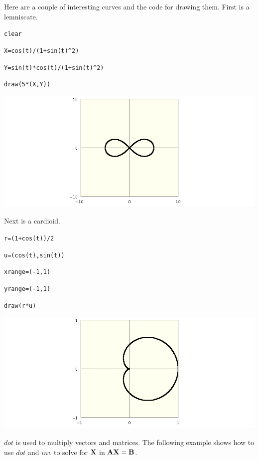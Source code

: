 \documentclass[11pt]{article}
\begin{document}
\newpage

\noindent
Here are a couple of interesting curves and the code for drawing them.
First is a lemniscate.

\medskip
\verb$clear$

\verb$X=cos(t)/(1+sin(t)^2)$

\verb$Y=sin(t)*cos(t)/(1+sin(t)^2)$

\verb$draw(5*(X,Y))$

\medskip
\begin{center}
\includegraphics[scale=0.4]{lemniscate.png}
\end{center}

\medskip
\noindent
Next is a cardioid.

\medskip
\verb$r=(1+cos(t))/2$

\verb$u=(cos(t),sin(t))$

\verb$xrange=(-1,1)$

\verb$yrange=(-1,1)$

\verb$draw(r*u)$

\medskip
\begin{center}
\includegraphics[scale=0.4]{cardioid.png}
\end{center}

\newpage


\noindent
$dot$ is used to multiply vectors and matrices.
The following example shows how to use $dot$ and $inv$ to solve for
$\bf X$ in $\bf AX=B$.
\end{document}
